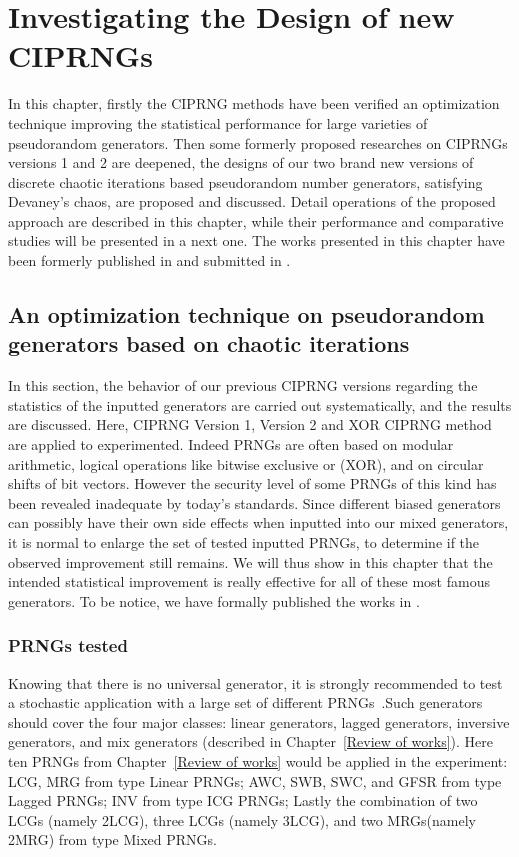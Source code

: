 \chapter{Investigating the Design of new CIPRNGs}
\label{CI dev}
\minitoc

In this chapter, firstly the CIPRNG methods have been verified an optimization technique improving the statistical performance for large varieties of pseudorandom generators. Then some formerly proposed researches on CIPRNGs versions 1 and 2 are deepened, the designs of our two brand new versions of discrete chaotic iterations based pseudorandom number generators, satisfying Devaney's chaos, are proposed and discussed. Detail operations of the proposed approach are described in this chapter, while their performance and  comparative studies will be presented in a next one. The works presented in this chapter have been formerly published in \cite{submit2,bfg12a:ip} and submitted in \cite{submit1, submit3}.

\section{An optimization technique on pseudorandom generators based on chaotic iterations}
In this section, the behavior of our previous CIPRNG versions regarding 
the statistics of the inputted generators are carried out systematically, and the results are discussed.
Here, CIPRNG Version 1, Version 2 and XOR CIPRNG method are applied to experimented.
Indeed PRNGs are often based on modular arithmetic, logical operations like bitwise exclusive or (XOR), and on circular shifts of bit vectors.
However the security level of some PRNGs of this kind has been revealed inadequate by today's standards.
Since different biased generators can possibly have their own side effects when inputted into our mixed generators, it is normal to enlarge the set of tested inputted PRNGs, to determine if the observed improvement still remains.
We will thus show in this chapter that the intended statistical improvement is really effective for all of these most famous generators. To be notice, we have formally published the works in \cite{bfg12a:ip}.

\subsection{PRNGs tested}
Knowing that there is no universal generator, it is strongly recommended to test a stochastic application with a large set of different PRNGs~\cite{DavidRC2003643}.Such generators should cover the four major classes: linear generators, lagged generators, inversive generators, and mix generators (described in Chapter~\ref{Review of works}). Here ten PRNGs from Chapter~\ref{Review of works} would be applied in the experiment: LCG, MRG from type Linear PRNGs; AWC, SWB, SWC, and GFSR from type Lagged PRNGs; INV from type ICG PRNGs; Lastly the combination of two LCGs (namely 2LCG), three LCGs (namely 3LCG), and two MRGs(namely 2MRG) from type Mixed PRNGs. 

